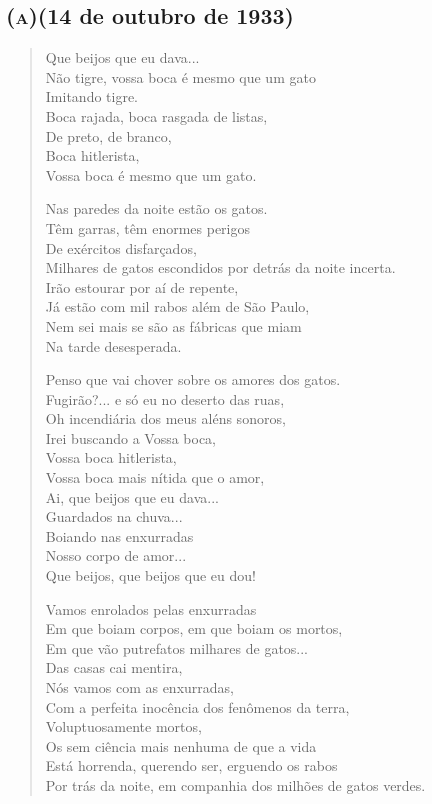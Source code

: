 \bigskip

\subsection{\textsc{(a)}\break (14 de outubro de 1933)}

\begin{verse}
Que beijos que eu dava...\\
Não tigre, vossa boca é mesmo que um gato\\
Imitando tigre.\\
Boca rajada, boca rasgada de listas,\\
De preto, de branco,\\
Boca hitlerista,\\
Vossa boca é mesmo que um gato.

Nas paredes da noite estão os gatos.\\
Têm garras, têm enormes perigos\\
De exércitos disfarçados,\\
Milhares de gatos escondidos por detrás da noite incerta.\\
Irão estourar por aí de repente,\\
Já estão com mil rabos além de São Paulo,\\
Nem sei mais se são as fábricas que miam\\
Na tarde desesperada.

Penso que vai chover sobre os amores dos gatos.\\
Fugirão?... e só eu no deserto das ruas,\\
Oh incendiária dos meus aléns sonoros,\\
Irei buscando a Vossa boca,\\
Vossa boca hitlerista,\\
Vossa boca mais nítida que o amor,\\
Ai, que beijos que eu dava...\\
Guardados na chuva...\\
Boiando nas enxurradas\\
Nosso corpo de amor...\\
Que beijos, que beijos que eu dou!

Vamos enrolados pelas enxurradas\\
Em que boiam corpos, em que boiam os mortos,\\
Em que vão putrefatos milhares de gatos...\\
Das casas cai mentira,\\
Nós vamos com as enxurradas,\\
Com a perfeita inocência dos fenômenos da terra,\\
Voluptuosamente mortos,\\
Os sem ciência mais nenhuma de que a vida\\
Está horrenda, querendo ser, erguendo os rabos\\
Por trás da noite, em companhia dos milhões de gatos verdes.
\end{verse}

